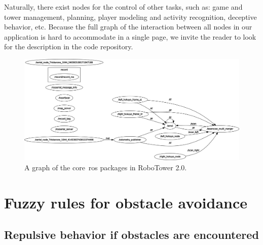 Naturally, there exist nodes for the control of other tasks, such as: game and tower management, planning, player modeling and activity recognition, deceptive behavior, etc. Because the full graph of the interaction between all nodes in our application is hard to accommodate in a single page, we invite the reader to look for the description in the code repository.

\begin{figure}[H]
	\centering
	\includegraphics[width=12cm]{images/A-hardware/rosgraph_triskar}
	\caption{A graph of the core~\gls{ros} packages in RoboTower 2.0.} 
	\label{fig:ros_graph_robotower}
\end{figure}

\section{Fuzzy rules for obstacle avoidance} 
\subsection{Repulsive behavior if obstacles are encountered}

